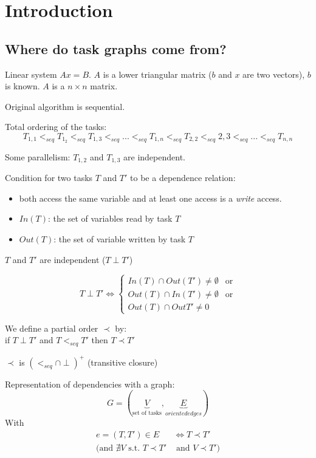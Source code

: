 \section{Introduction}
\subsection*{Where do task graphs come from?}
Linear system $Ax=B$. $A$ is a lower triangular matrix ($b$ and $x$ are two vectors), $b$ is known. $A$ is a $n \times n$ matrix.

\begin{algorithm}[H]
\end{algorithm}


Original algorithm is sequential.


Total ordering of the tasks:
\[T_{1,1} <_{seq} T_{1_2} <_{seq} T_{1,3} <_{seq} ... <_{seq} T_{1,n} <_{seq} T_{2,2} <_{seq} 2,3 <_{seq} ... <_{seq} T_{n,n}\]

Some parallelism: $T_{1,2}$ and $T_{1,3}$ are independent.

Condition for two tasks $T$ and $T'$ to be a dependence relation:
\begin{itemize}
\item both access the same variable and at least one access is a \emph{write} access.
\item $In(T)$: the set of variables read by task $T$
\item $Out(T)$: the set of variable written by task $T$
\end{itemize}

$T$ and $T'$ are independent ($T \perp T'$)

\[T \perp T' \Leftrightarrow
\begin{cases}
In(T)\cap Out(T')\neq \emptyset & \text{or}\\ 
Out(T)\cap In(T') \neq \emptyset &\text{or}\\
Out(T)\cap Out{T'} \neq 0
\end{cases}
\]

We define a partial order $\prec$ by:\\
if $T\perp T'$ and $T<_{seq} T'$ then $T\prec T'$

$\prec$ is $(<_{seq}\cap \perp)^+$ (transitive closure)

Representation of dependencies with a graph:
\[G=(\underbrace{V}_{\text{set of tasks}},\underbrace{E}_{oriented edges})\]
With
\begin{align*}
e=(T,T')\in E & \Leftrightarrow T \prec T'\\
\big(\text{and } \nexists V \text{ s.t. } T\prec T' & \text{ and } V \prec T' \big)\\
\end{align*}

